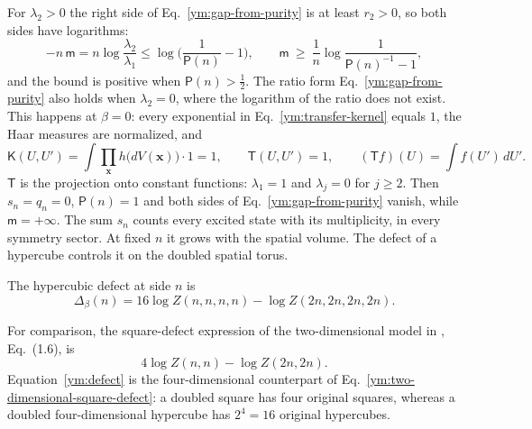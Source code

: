 For $\lambda_2>0$ the right side of Eq.~\eqref{ym:gap-from-purity} is at least
$r_2>0$, so both sides have logarithms:
\begin{equation}\label{ym:gap-from-purity-log}
 -n\,\mathsf m=n\log\frac{\lambda_2}{\lambda_1}\le
 \log\Big(\frac{1}{\mathsf P(n)}-1\Big),\qquad
 \mathsf m\ \ge\ \frac1n\log\frac{1}{\mathsf P(n)^{-1}-1},
\end{equation}
and the bound is positive when $\mathsf P(n)>\frac12$. The ratio form
Eq.~\eqref{ym:gap-from-purity} also holds when $\lambda_2=0$, where the
logarithm of the ratio does not exist. This happens at $\beta=0$: every
exponential in Eq.~\eqref{ym:transfer-kernel} equals $1$, the Haar measures
are normalized, and
\begin{equation}\label{ym:rank-one}
 \mathsf K(U,U')=\int\prod_{\mathbf x}h\big(dV(\mathbf x)\big)\cdot1=1,\qquad
 \mathsf T(U,U')=1,\qquad
 (\mathsf Tf)(U)=\int f(U')\,dU' .
\end{equation}
$\mathsf T$ is the projection onto constant functions: $\lambda_1=1$ and
$\lambda_j=0$ for $j\ge2$. Then $s_n=q_n=0$, $\mathsf P(n)=1$ and both sides
of Eq.~\eqref{ym:gap-from-purity} vanish, while $\mathsf m=+\infty$.
The sum $s_n$ counts every excited state with its multiplicity, in every
symmetry sector. At fixed $n$ it grows with the spatial volume. The defect of
a hypercube controls it on the doubled spatial torus.
\begin{definition}\label{ym:def:defect}
The hypercubic defect at side $n$ is
\begin{equation}\label{ym:defect}
 \Delta_\beta(n)=16\log Z(n,n,n,n)-\log Z(2n,2n,2n,2n).
\end{equation}
\end{definition}
For comparison, the square-defect expression of the two-dimensional
model in \cite{OpenAIO4Sharp2026}, Eq.~(1.6), is
\begin{equation}\label{ym:two-dimensional-square-defect}
 4\log Z(n,n)-\log Z(2n,2n).
\end{equation}
Equation~\eqref{ym:defect} is the four-dimensional counterpart of
Eq.~\eqref{ym:two-dimensional-square-defect}: a doubled square has four
original squares, whereas a doubled four-dimensional hypercube has
$2^4=16$ original hypercubes.
